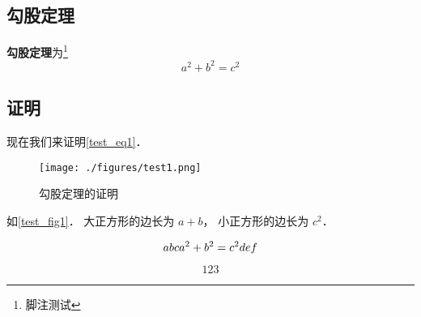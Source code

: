 

\subsection{勾股定理}
\textbf{勾股定理}为\footnote{脚注测试}
\begin{equation}\label{test_eq1}
a^2 + b^2 = c^2
\end{equation}

\subsection{证明}
现在我们来证明\autoref{test_eq1}．

\begin{figure}[ht]
\centering
\texttt{[image: ./figures/test1.png]}
\caption{勾股定理的证明} \label{test_fig1}
\end{figure}

如\autoref{test_fig1}． 大正方形的边长为 $a + b$， 小正方形的边长为 $c^2$． 

\begin{equation}
abc\\
a^2 + b^2 = c^2\\
def
\end{equation}

\begin{equation}
123
\end{equation}
